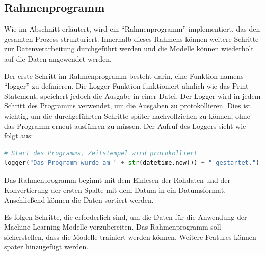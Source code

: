 \subsection{Rahmenprogramm}\label{sec:Rahmenprogramm}
Wie im Abschnitt  erläutert, wird ein \enquote{Rahmenprogramm} implementiert, das den gesamten Prozess strukturiert. Innerhalb dieses Rahmens können weitere Schritte zur Datenverarbeitung durchgeführt werden und die Modelle können wiederholt auf die Daten angewendet werden.

Der erste Schritt im Rahmenprogramm besteht darin, eine Funktion namens \enquote{logger} zu definieren. Die Logger Funktion funktioniert ähnlich wie das Print-Statement, speichert jedoch die Ausgabe in einer Datei. Der Logger wird in jedem Schritt des Programms verwendet, um die Ausgaben zu protokollieren. Dies ist wichtig, um die durchgeführten Schritte später nachvollziehen zu können, ohne das Programm erneut ausführen zu müssen. Der Aufruf des Loggers sieht wie folgt aus:

\begin{lstlisting}[language=Python, caption=Logger Initialisierung]
# Start des Programms, Zeitstempel wird protokolliert
logger("Das Programm wurde am " + str(datetime.now()) + " gestartet.")
\end{lstlisting}

Das Rahmenprogramm beginnt mit dem Einlesen der Rohdaten und der Konvertierung der ersten Spalte mit dem Datum in ein Datumsformat. Anschließend können die Daten sortiert werden. 

Es folgen Schritte, die erforderlich sind, um die Daten für die Anwendung der Machine Learning Modelle vorzubereiten. Das Rahmenprogramm soll sicherstellen, dass die Modelle trainiert werden können. Weitere Features können später hinzugefügt werden.

